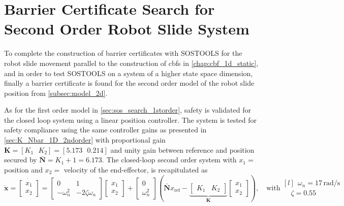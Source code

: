 
\section{Barrier Certificate Search for Second Order Robot Slide System}\label{sec:sos_2ndorder_error}

To complete the construction of barrier certificates with SOSTOOLS for the robot slide movement parallel to the construction of \glspl{cbf} in \autoref{chap:cbf_1d_static}, and in order to test SOSTOOLS on a system of a higher state space dimension, finally a barrier certificate is found for the second order model of the robot slide position from \autoref{subsec:model_2d}. 

As for the first order model in \autoref{sec:sos_search_1storder}, safety is validated for the closed loop system using a linear position controller. The system is tested for safety compliance using the same controller gains as presented in \autoref{sec:K_Nbar_1D_2ndorder} with proportional gain $\mathbf{K}=[K_1\,\,\,\,K_2]=[5.173\,\,\,\,0.214]$ and unity gain between reference and position secured by $\bar{\mathbf{N}}=K_1+1=6.173$. The closed-loop second order system with $x_1=$ position and $x_2=$ velocity of the end-effector, is recapitulated as
\begin{equation}
\dot{\mathbf{x}} = 
\dot{\begin{bmatrix}
	x_1\\x_2
	\end{bmatrix}} = 
\begin{bmatrix}
0 & 1\\
-\omega_n^2  & -2\zeta \omega_n  
\end{bmatrix}
\begin{bmatrix}
x_1\\x_2
\end{bmatrix} + 
\begin{bmatrix}
0\\\omega_n^2
\end{bmatrix}\left(\bar{\mathbf{N}}x_\text{ref}-
\underbrace{\begin{bmatrix}
K_1 & K_2
\end{bmatrix}}_{\mathbf{K}}
\begin{bmatrix}
x_1\\x_2
\end{bmatrix}\right),
 \quad \text{with}
\begin{matrix*}[l]
\phantom{\zeta}\omega_n = 17 \,\text{rad/s}\\  \phantom{\omega_n}\zeta = 0.55
\end{matrix*}
\label{eq:sos_2ndorder}
\end{equation}
